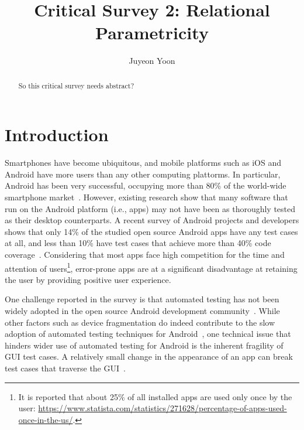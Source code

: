 \documentclass[sigconf]{acmart}
\begin{document}
\title{Critical Survey 2: Relational Parametricity}

\author{Juyeon Yoon}


\begin{abstract}
  So this critical survey needs abstract?

\end{abstract}

\maketitle

\section{Introduction}
\label{sec:intro}

Smartphones have become ubiquitous, and mobile platforms such as iOS and Android
have more users than any other computing plattorms. In particular, Android has
been very successful, occupying more than 80\% of the world-wide smartphone
market~\cite{idc-smartphones}. However, existing research show that many
software that run on the Android platform (i.e., apps) may not have been as
thoroughly tested as their desktop counterparts. A recent survey of Android
projects and developers shows that only 14\% of the studied open source
Android apps have any test cases at all, and less than 10\% have test cases
that achieve more than 40\% code coverage~\cite{Kochhar2015lp}. Considering
that most apps face high competition for the time and attention of users\footnote{It is reported that about 25\% of all installed apps are used only
  once by the user: \url{https://www.statista.com/statistics/271628/percentage-of-apps-used-once-in-the-us/}.}, error-prone apps
are at a significant disadvantage at retaining the user by providing positive
user experience.

One challenge reported in the survey is that automated testing has not been
widely adopted in the open source Android development community~\cite{Kochhar2015lp}. While other factors such as device fragmentation do indeed
contribute to the slow adoption of automated testing techniques for Android~\cite{Muccini2012pv}, one technical issue that hinders wider use of automated
testing for Android is the inherent fragility of GUI test cases. A relatively
small change in the appearance of an app can break test cases that traverse
the GUI~\cite{Coppola2016rd}.
\end{document}
